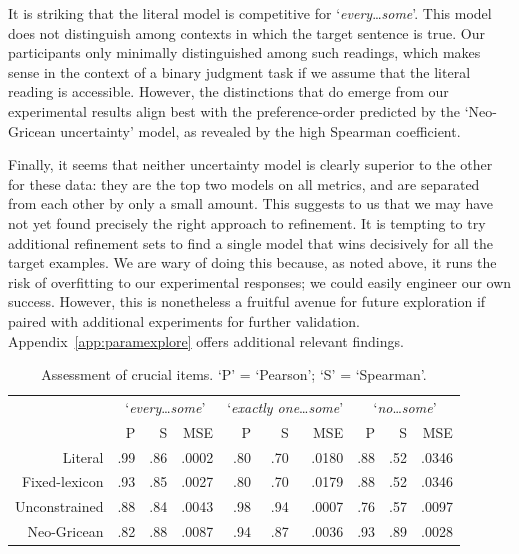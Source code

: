 \documentclass[leqno,12pt]{article}
\newcommand{\Appendixref}[1]{Appendix~\ref{#1}}
\newcommand{\word}[1]{\emph{#1}}
\newcommand{\graycell}[1]{{\cellcolor[gray]{.8}#1}}
\newcommand{\target}[2]{`\word{#1}\ldots\word{#2}'}
\begin{document}
{It is striking that the literal model is competitive for
\target{every}{some}. This model does not distinguish among contexts
in which the target sentence is true. Our participants only minimally
distinguished among such readings, which makes sense in the context of
a binary judgment task if we assume that the literal reading is
accessible. However, the distinctions that do emerge from our
experimental results align best with the preference-order predicted by
the `Neo-Gricean uncertainty' model, as revealed by the high Spearman
coefficient.

Finally, it seems that neither uncertainty model is clearly superior
to the other for these data: they are the top two models on all
metrics, and are separated from each other by only a small amount.
This suggests to us that we may have not yet found precisely the right
approach to refinement. It is tempting to try additional refinement
sets to find a single model that wins decisively for all the target
examples. We are wary of doing this because, as noted above, it runs
the risk of overfitting to our experimental responses; we could easily
engineer our own success.  However, this is nonetheless a fruitful
avenue for future exploration if paired with additional experiments
for further validation. \Appendixref{app:paramexplore} offers
additional relevant findings.

\begin{table}[t]
  \centering
  \setlength{\tabcolsep}{4pt}
  \newcommand{\rcoldiv}{\hspace{44pt}}
  
  \begin{tabular}[c]{r rrr @{\rcoldiv} rrr  @{\rcoldiv} rrr }
    \toprule
    & 
    \multicolumn{3}{c}{\target{every}{some}}{\rcoldiv} & 
    \multicolumn{3}{c}{\target{exactly one}{some}}{\rcoldiv} &
    \multicolumn{3}{c}{\target{no}{some}} \\
    & 
    P & S & MSE & 
    P & S & MSE & 
    P & S & MSE \\
    \midrule  
    Literal       & \graycell{.99} &            .86 & \graycell{.0002} &            .80 &            .70 &            .0180 &            .88 &            .52 &            .0346 \\
    Fixed-lexicon &            .93 &            .85 &            .0027 &            .80 &            .70 &            .0179 &            .88 &            .52 &            .0346 \\
    Unconstrained &            .88 &            .84 &            .0043 & \graycell{.98} & \graycell{.94} & \graycell{.0007} &            .76 &            .57 &            .0097 \\
    Neo-Gricean   &            .82 & \graycell{.88} &            .0087 &            .94 &            .87 &            .0036 & \graycell{.93} & \graycell{.89} & \graycell{.0028} \\
    \bottomrule
  \end{tabular}
  \caption{Assessment of crucial items. `P' = `Pearson'; `S' = `Spearman'.}
  \label{tab:crucial-items}
\end{table}

}
\end{document}
